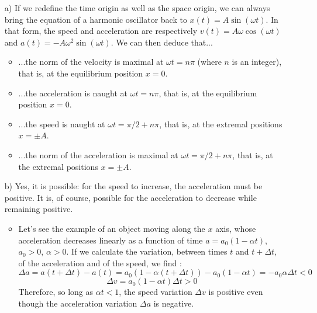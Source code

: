 %
%

\begin{center}
\vspace*{5mm}
\end{center}



\begin{enumerate}
\item[a)] If we redefine the time origin as well as the space origin, we can always bring the equation of a harmonic oscillator back to $x(t)=A\sin(\omega t)$. In that form, the speed and acceleration are respectively $v(t)=A\omega \cos(\omega t)$ and $a(t)=-A\omega^2\sin(\omega t)$. We can then deduce that...
\begin{itemize}
\item ...the norm of the velocity is maximal at $\omega t=n\pi$ (where $n$ is an integer), that is, at the equilibrium position $x=0$.
\item ...the acceleration is naught at  $\omega t=n\pi$, that is, at the equilibrium position $x=0$.
\item ...the speed is naught at $\omega t=\pi/2+n\pi$, that is, at the extremal positions $x=\pm A$. 
\item ...the norm of the acceleration is maximal at $\omega t=\pi/2+n\pi$, that is, at the extremal positions $x=\pm A$. 
\end{itemize}
\item[b)] Yes, it is possible: for the speed to increase, the acceleration must be positive. It is, of course, possible for the acceleration to decrease while remaining positive. 
\begin{itemize}
\item Let's see the example of an object moving along the $x$ axis, whose acceleration decreases linearly as a function of time $a=a_0(1-\alpha t)$, $a_0>0$, $\alpha >0$. If we calculate the variation, between times $t$ and   $t+\Delta t$, of the acceleration and of the speed, we find :
$$\Delta a=a(t+\Delta t)-a(t)=a_0(1-\alpha(t+\Delta t))-a_0(1-\alpha t)=-a_0 \alpha \Delta t <0$$
$$
\Delta v=a_0 (1-\alpha t)\Delta t >0  
$$
Therefore, so long as $\alpha t<1$, the speed variation $\Delta v$ is positive even though the acceleration variation $\Delta a$ is negative.


\end{itemize}
\end{enumerate}
